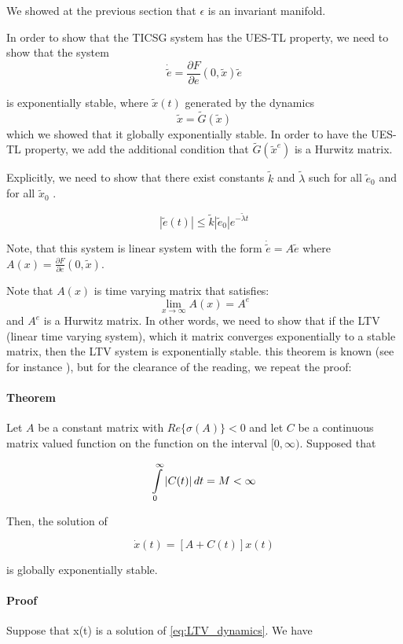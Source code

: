 \documentclass[letterpaper, 10 pt, conference]{ieeeconf}  %
\begin{document}
We showed at the previous section that $\epsilon$ is an invariant manifold. 

In order to show that the TICSG system has the  UES-TL property, we need to show that the system  
$$
\dot{\tilde{e}}=\frac{\partial F}{\partial e}(0,\tilde{x})\tilde{e}
$$

is exponentially stable, where $\tilde{x}(t)$ generated by the dynamics 
$$
\tilde{x}=\tilde{G}(\tilde{x})
$$
 which we showed that it globally exponentially stable.
In order to have the UES-TL property, we  add the additional condition  that $\tilde{G}(\tilde{x}^e)$
is a Hurwitz matrix.

 Explicitly, we need to show that there exist constants $\tilde{k}$
and $\tilde{\lambda}$ such for all $\tilde{e}_0$ and for all
$\tilde{x}_0$ .

$$
\left| \tilde{e}(t)\right|\leq \tilde{k}\left| \tilde{e}_{0}\right|  e^{-\tilde{\lambda} t}
$$

Note, that this system is linear system with the form $
\dot{\tilde{e}}=A\tilde{e}
$ where  $A\left(x\right)=\frac{\partial F}{\partial e}(0,\tilde{x})$.


Note that $A\left(x \right)$ is time varying matrix that satisfies: 
$$\lim_{x \to \infty} A\left(x \right) = A^e$$
and $A^e$ is a Hurwitz matrix.
In other words, we need to show that if the LTV (linear time varying system),
which it matrix converges exponentially to a stable matrix, then the
LTV system is exponentially stable. this theorem is known (see for instance \cite{SchovanecGilliam1999}),
but for the clearance of the reading, we  repeat the proof:
\paragraph{Theorem}
Let $A$ be a constant matrix with $Re\{\sigma(A)\}<0$ and let $C$
be a continuous matrix valued function on the function on the interval
$[0,\infty)$. Supposed that 

\[
\intop_{0}^{\infty}\left|C(t)\right|dt=M<\infty
\]

Then, the solution of 

\begin{equation}
\dot{x}(t)=[A+C(t)]x(t)\label{eq:LTV_dynamics}
\end{equation}

is globally exponentially stable.

\paragraph{Proof}
Suppose that x(t) is a solution of \eqref{eq:LTV_dynamics}.
We have 
\end{document}
